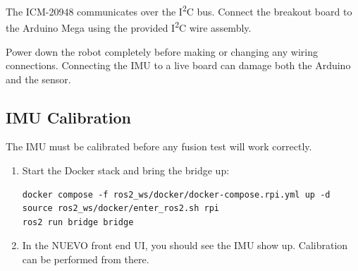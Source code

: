 \documentclass[12pt,letterpaper]{article}
\newcommand{\diagramplaceholder}[2][4cm]{%
  \begin{center}
    \fbox{\begin{minipage}{0.85\textwidth}
      \vspace{#1}
      \centering\textit{[Diagram: #2]}
      \vspace{#1}
    \end{minipage}}
  \end{center}
}
\begin{document}
The ICM-20948 communicates over the I\textsuperscript{2}C bus.
Connect the breakout board to the Arduino Mega using the provided
I\textsuperscript{2}C wire assembly.

\begin{warningbox}
  Power down the robot completely before making or changing any wiring
  connections. Connecting the IMU to a live board can damage both the
  Arduino and the sensor.
\end{warningbox}




\subsection{IMU Calibration}

The IMU must be calibrated before any fusion test will work
correctly.

\begin{enumerate}
  \item Start the Docker stack and bring the bridge up:
\begin{lstlisting}[style=bash]
docker compose -f ros2_ws/docker/docker-compose.rpi.yml up -d
source ros2_ws/docker/enter_ros2.sh rpi
ros2 run bridge bridge
\end{lstlisting}
  \item In the NUEVO front end UI, you should see the IMU show up. Calibration can be performed from there.
\end{enumerate}
\end{document}
